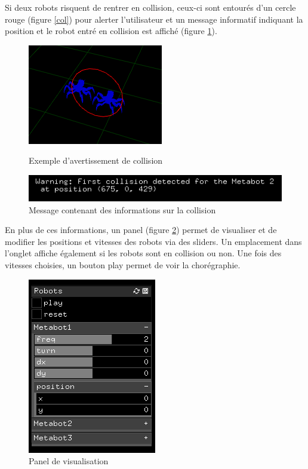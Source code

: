 Si deux robots risquent de rentrer en collision, ceux-ci sont entourés d'un cercle rouge (figure \ref{col}) pour alerter l'utilisateur et un message informatif indiquant la position et le robot entré en collision est affiché (figure \ref{mcol}).

\begin{figure}[htbp]
\begin{minipage}[c]{.45\linewidth}
\begin{center}
\includegraphics[scale=0.45]{imgs/collision}
\caption{Exemple d'avertissement de collision}
\label{col}
\end{center}
\end{minipage}
\hspace*{0.5cm}
\begin{minipage}[c]{.5\linewidth}
\begin{center}
\includegraphics[scale=0.6]{imgs/mcollision}
\caption{Message contenant des informations sur la collision}
\label{mcol}
\end{center}
\end{minipage}
\end{figure}

En plus de ces informations, un panel (figure \ref{pan}) permet de visualiser et de modifier les positions et vitesses des robots via des sliders. Un emplacement dans l'onglet affiche également si les robots sont en collision ou non. Une fois des vitesses choisies, un bouton play permet de voir la chorégraphie. 

\begin{figure}[H]
\centering
\includegraphics[scale=0.6]{imgs/panel2}
\caption{Panel de visualisation}
\label{pan}
\end{figure}


